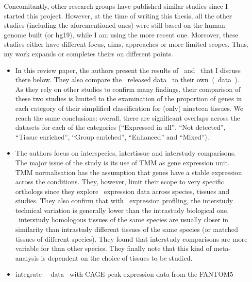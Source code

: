 Concomitantly, other research groups have published similar studies
since I started this project.
However, at the time of writing this thesis,
all the other studies (including the aforementioned ones)
were still based on the human genome built  (or hg19),
while I am using the more recent  one.
Moreover, these studies either have different focus, aims,
approaches or more limited scopes.
Thus, my work expands or completes theirs on different points.
\begin{itemize}[topsep=0pt,nosep]
\item{} In this review paper,
the authors present the results of~\cite{Yu2015-uh} and~\cite{Danielsson2015-cn}
that I discuss there below.
They also compare the \gtex\ released data~
to their own~(\uhlen\ data~).
As they rely on other studies to confirm many findings,
their comparison of these two studies is
limited to the examination of
the proportion of genes in each category of their simplified classification
for (only) nineteen tissues.
We reach the same conclusions:
overall, there are significant overlaps across the datasets for each of the
categories (\enquote{Expressed in all}, \enquote{Not detected},
\enquote{Tissue enriched}, \enquote{Group enriched}, \enquote{Enhanced} and
\enquote{Mixed}).
\item{}
The authors focus on interspecies, intertissue and interstudy comparisons.
The major issue of the study is its use of \gls{TMM} as gene expression unit.
\gls{TMM} normalisation has the assumption that
genes have a stable expression across the conditions.
They, however, limit their scope to very specific orthologs
since they explore \Rnaseq\ expression data across species, tissues and studies.
They also confirm that with \Rnaseq\ expression profiling,
the interstudy technical variation is generally lower than
the intrastudy biological one, \ie\
interstudy homologous tissues of the same species are usually
closer in similarity than intrastudy different tissues of the same species
(or matched tissues of different species).
They found that interstudy comparisons are more variable for 
than other species.
They finally note that this kind of meta-analysis is dependent on
the choice of tissues to be studied.
\item{} integrate \uhlen\ \etal\ data~
with \gls{CAGE} peak expression data from the \gls{FANTOM5}

\end{itemize}
